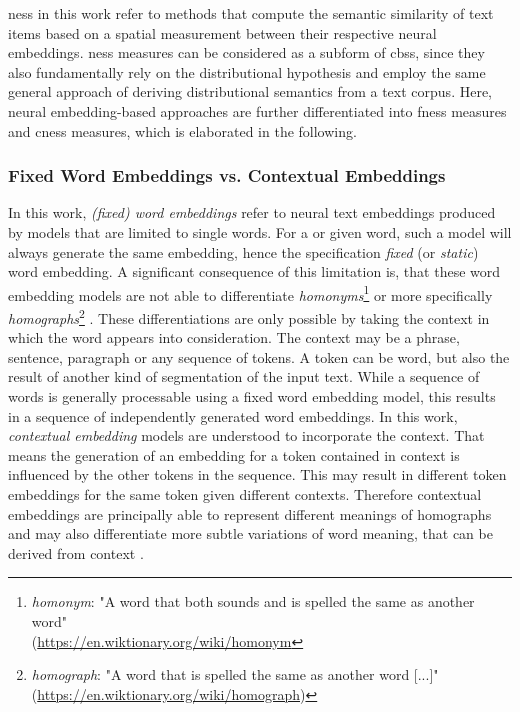 \documentclass[11pt]{scrreprt}
\let\cite\parencite  %
\begin{document}
\gls{ness} in this work refer to methods that compute the semantic similarity of text items based on a spatial measurement between their respective neural embeddings. \gls{ness} measures can be considered as a subform of \gls{cbss}, since they also fundamentally rely on the distributional hypothesis and employ the same general approach of deriving distributional semantics from a text corpus. Here, neural embedding-based approaches are further differentiated into \gls{fness} measures and \gls{cness} measures, which is elaborated in the following. 


\subsubsection{Fixed Word Embeddings vs. Contextual Embeddings}
\label{sec:fixed-word-vs-contextual-embeddings}
In this work, \textit{(fixed) word embeddings} refer to neural text embeddings produced by models  that are limited to single words. For a or given word, such a model will always generate the same embedding, hence the specification \textit{fixed} (or \textit{static}) word embedding. A significant consequence of this limitation is, that these word embedding models are not able to differentiate \textit{homonyms}\footnote{\textit{homonym}: "A word that both sounds and is spelled the same as another word"\\(\url{https://en.wiktionary.org/wiki/homonym}} or more specifically \textit{homographs}\footnote{\textit{homograph}: "A word that is spelled the same as another word [...]"\\(\url{https://en.wiktionary.org/wiki/homograph})} \cite{liWordEmbeddingUnderstanding2018}. These differentiations are only possible by taking the context in which the word appears into consideration. The context may be a phrase, sentence, paragraph or any sequence of tokens. A token can be word, but also the result of another kind of segmentation of the input text. While a sequence of words is generally processable using a fixed word embedding model, this results in a sequence of independently generated word embeddings. In this work, \textit{contextual embedding} models are understood to incorporate the context. That means the generation of an embedding for a token contained in context is influenced by the other tokens in the sequence. This may result in different token embeddings for the same token given different contexts. Therefore contextual embeddings are principally able to represent different meanings of homographs and may also differentiate more subtle variations of word meaning, that can be derived from context \cite{liuSurveyContextualEmbeddings2020}.
\end{document}
